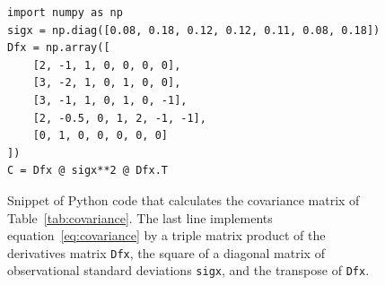 \begin{figure}
  \centering
  \footnotesize
  \begin{verbatim}
import numpy as np
sigx = np.diag([0.08, 0.18, 0.12, 0.12, 0.11, 0.08, 0.18])
Dfx = np.array([
    [2, -1, 1, 0, 0, 0, 0],
    [3, -2, 1, 0, 1, 0, 0],
    [3, -1, 1, 0, 1, 0, -1],
    [2, -0.5, 0, 1, 2, -1, -1],
    [0, 1, 0, 0, 0, 0, 0]
])
C = Dfx @ sigx**2 @ Dfx.T
  \end{verbatim}
  \caption{Snippet of Python code that calculates the
    covariance matrix of Table~\ref{tab:covariance}.  The last line
    implements equation~\eqref{eq:covariance} by a triple matrix
    product of the derivatives matrix \texttt{Dfx}, the square of a
    diagonal matrix of observational standard deviations \texttt{sigx},
    and the transpose of \texttt{Dfx}.}
  \label{fig:python-covar}
\end{figure}


